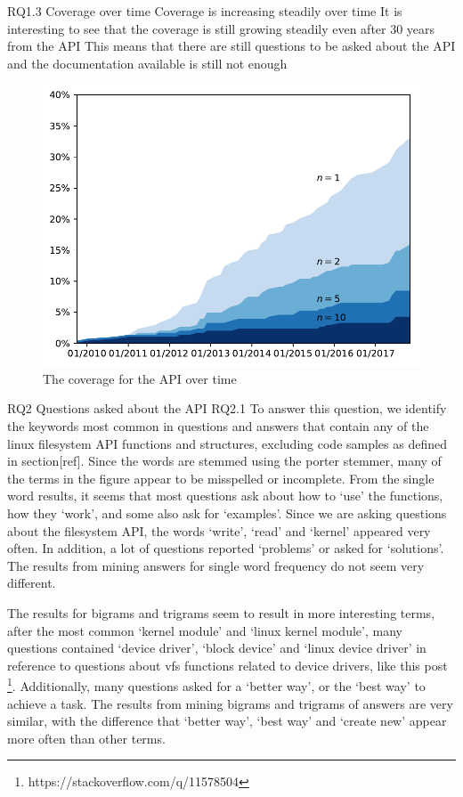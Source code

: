 RQ1.3
Coverage over time
Coverage is increasing steadily over time
It is interesting to see that the coverage is still growing steadily even after 30 years from the API
This means that there are still questions to be asked about the API and the documentation available is still not enough

\begin{figure}
  \includegraphics{scripts/figures/1-3-coverage-by-time}
  \caption{The coverage for the API over time}
  \label{fig:coveragetime}
\end{figure}


RQ2
Questions asked about the API
RQ2.1
To answer this question, we identify the keywords most common in questions and answers that contain any of the linux filesystem API functions and structures, excluding code samples as defined in section[ref]. Since the words are stemmed using the porter stemmer, many of the terms in the figure appear to be misspelled or incomplete.
From the single word results, it seems that most questions ask about how to `use' the functions, how they `work', and some also ask for `examples'. Since we are asking questions about the filesystem API, the words `write', `read' and `kernel' appeared very often. In addition, a lot of questions reported `problems' or asked for `solutions'. The results from mining answers for single word frequency do not seem very different.

The results for bigrams and trigrams seem to result in more interesting terms, after the most common `kernel module' and `linux kernel module', many questions contained `device driver', `block device' and `linux device driver' in reference to questions about vfs functions related to device drivers, like this post \footnote{https://stackoverflow.com/q/11578504}. Additionally, many questions asked for a `better way', or the `best way' to achieve a task.
The results from mining bigrams and trigrams of answers are very similar, with the difference that `better way', `best way' and `create new' appear more often than other terms.

